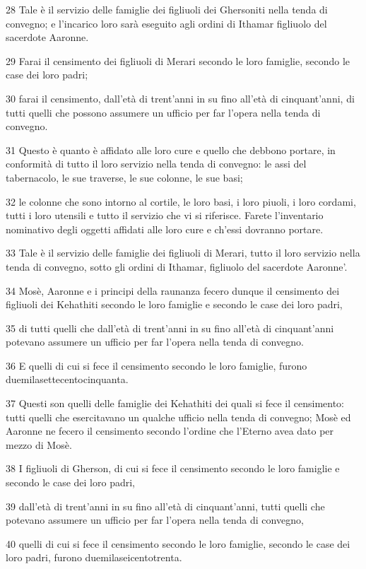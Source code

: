 \par 28 Tale è il servizio delle famiglie dei figliuoli dei Ghersoniti nella tenda di convegno; e l'incarico loro sarà eseguito agli ordini di Ithamar figliuolo del sacerdote Aaronne.
\par 29 Farai il censimento dei figliuoli di Merari secondo le loro famiglie, secondo le case dei loro padri;
\par 30 farai il censimento, dall'età di trent'anni in su fino all'età di cinquant'anni, di tutti quelli che possono assumere un ufficio per far l'opera nella tenda di convegno.
\par 31 Questo è quanto è affidato alle loro cure e quello che debbono portare, in conformità di tutto il loro servizio nella tenda di convegno: le assi del tabernacolo, le sue traverse, le sue colonne, le sue basi;
\par 32 le colonne che sono intorno al cortile, le loro basi, i loro piuoli, i loro cordami, tutti i loro utensili e tutto il servizio che vi si riferisce. Farete l'inventario nominativo degli oggetti affidati alle loro cure e ch'essi dovranno portare.
\par 33 Tale è il servizio delle famiglie dei figliuoli di Merari, tutto il loro servizio nella tenda di convegno, sotto gli ordini di Ithamar, figliuolo del sacerdote Aaronne'.
\par 34 Mosè, Aaronne e i principi della raunanza fecero dunque il censimento dei figliuoli dei Kehathiti secondo le loro famiglie e secondo le case dei loro padri,
\par 35 di tutti quelli che dall'età di trent'anni in su fino all'età di cinquant'anni potevano assumere un ufficio per far l'opera nella tenda di convegno.
\par 36 E quelli di cui si fece il censimento secondo le loro famiglie, furono duemilasettecentocinquanta.
\par 37 Questi son quelli delle famiglie dei Kehathiti dei quali si fece il censimento: tutti quelli che esercitavano un qualche ufficio nella tenda di convegno; Mosè ed Aaronne ne fecero il censimento secondo l'ordine che l'Eterno avea dato per mezzo di Mosè.
\par 38 I figliuoli di Gherson, di cui si fece il censimento secondo le loro famiglie e secondo le case dei loro padri,
\par 39 dall'età di trent'anni in su fino all'età di cinquant'anni, tutti quelli che potevano assumere un ufficio per far l'opera nella tenda di convegno,
\par 40 quelli di cui si fece il censimento secondo le loro famiglie, secondo le case dei loro padri, furono duemilaseicentotrenta.
